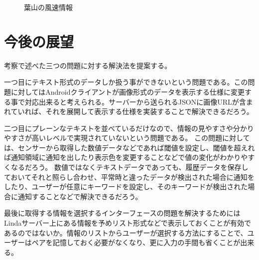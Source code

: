 \begin{figure}[htbp]
  \begin{minipage}{\hsize}
    \begin{center}
    \end{center}
    \caption{葉山の風速情報}
    \label{fig:hayama_wind}
  \end{minipage}
\end{figure}

\section{今後の展望}

考察で述べた三つの問題に対する解決法を提案する。

一つ目にテキスト形式のデータしか扱う事ができないという問題である。この問題に対してはAndroidクライアントが画像形式のデータを表示する仕様に変更する事で対応出来ると考えられる。サーバーから送られるJSONに画像URLが含まれていれば、それを展開して表示する仕様を実装することで解決できるだろう。

二つ目にプレーンなテキストを並べているだけなので、情報の見やすさや分かりやすさが高いレベルで実現されていないという問題である。
この問題に対しては、センサーから取得した数値データなどであれば閾値を設定し、閾値を超えれば通知領域に通知を出したり表示色を変更することなどで値の変化がわかりやすくなるだろう。
数値ではなくテキストデータであっても、履歴データを保存しておいてそれと照らし合わせ、平常時と違ったデータが検出された場合に通知をしたり、ユーザーが任意にキーワードを設定し、そのキーワードが検出された場合に通知することなどで解決できるだろう。

最後に取得する情報を選択するインターフェースの問題を解決するためにはLindaサーバー上にある情報を予めリスト形式などで表示しておくことが有効であるのではないか。情報のリストからユーザーが選択する方法にすることで、ユーザーはペアを記憶しておく必要がなくなり、更に入力の手間も省くことが出来る。
